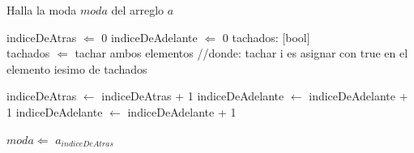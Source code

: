 \begin{algorithm}
\caption{Halla la moda $moda$ del arreglo $a$}
\begin{algorithmic}[1]
\STATE indiceDeAtras $\Leftarrow$ 0
\STATE indiceDeAdelante $\Leftarrow$ 0
\STATE tachados: [bool] \\
        \STATE tachados $\Leftarrow$ tachar ambos elementos //donde: tachar i es asignar con true en el elemento iesimo de tachados

            \STATE indiceDeAtras $\leftarrow$ indiceDeAtras + 1
        \ENDWHILE
            \STATE indiceDeAdelante $\leftarrow$ indiceDeAdelante + 1
        \ENDWHILE
    \ELSE
        \STATE indiceDeAdelante $\leftarrow$ indiceDeAdelante + 1
    \ENDIF

\ENDWHILE
\STATE $moda \Leftarrow$ $a_{indiceDeAtras}$
\end{algorithmic}
\end{algorithm}

